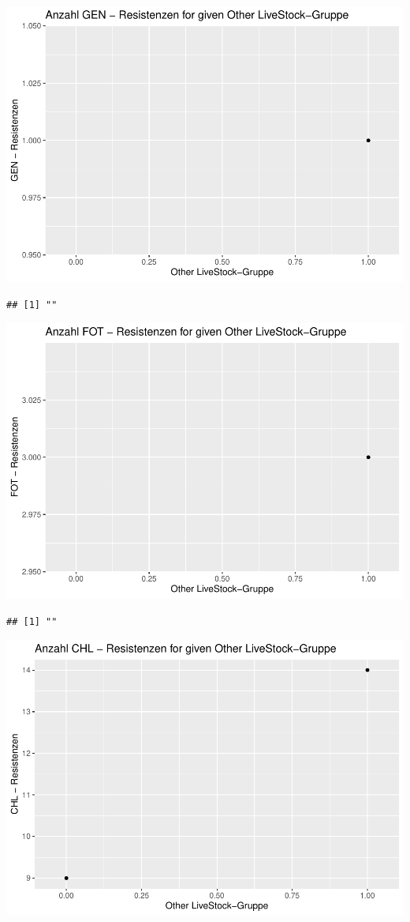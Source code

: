 \documentclass[
]{article}
\begin{document}
\includegraphics{NResistenzen_files/figure-latex/binary_or_nominal_variables-14.pdf}

\begin{verbatim}
## [1] ""
\end{verbatim}

\includegraphics{NResistenzen_files/figure-latex/binary_or_nominal_variables-15.pdf}

\begin{verbatim}
## [1] ""
\end{verbatim}

\includegraphics{NResistenzen_files/figure-latex/binary_or_nominal_variables-16.pdf}
\end{document}
